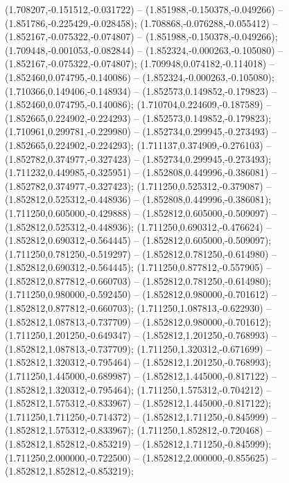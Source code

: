  (1.708207,-0.151512,-0.031722) -- (1.851988,-0.150378,-0.049266) -- (1.851786,-0.225429,-0.028458);
 (1.708868,-0.076288,-0.055412) -- (1.852167,-0.075322,-0.074807) -- (1.851988,-0.150378,-0.049266);
 (1.709448,-0.001053,-0.082844) -- (1.852324,-0.000263,-0.105080) -- (1.852167,-0.075322,-0.074807);
 (1.709948,0.074182,-0.114018) -- (1.852460,0.074795,-0.140086) -- (1.852324,-0.000263,-0.105080);
 (1.710366,0.149406,-0.148934) -- (1.852573,0.149852,-0.179823) -- (1.852460,0.074795,-0.140086);
 (1.710704,0.224609,-0.187589) -- (1.852665,0.224902,-0.224293) -- (1.852573,0.149852,-0.179823);
 (1.710961,0.299781,-0.229980) -- (1.852734,0.299945,-0.273493) -- (1.852665,0.224902,-0.224293);
 (1.711137,0.374909,-0.276103) -- (1.852782,0.374977,-0.327423) -- (1.852734,0.299945,-0.273493);
 (1.711232,0.449985,-0.325951) -- (1.852808,0.449996,-0.386081) -- (1.852782,0.374977,-0.327423);
 (1.711250,0.525312,-0.379087) -- (1.852812,0.525312,-0.448936) -- (1.852808,0.449996,-0.386081);
 (1.711250,0.605000,-0.429888) -- (1.852812,0.605000,-0.509097) -- (1.852812,0.525312,-0.448936);
 (1.711250,0.690312,-0.476624) -- (1.852812,0.690312,-0.564445) -- (1.852812,0.605000,-0.509097);
 (1.711250,0.781250,-0.519297) -- (1.852812,0.781250,-0.614980) -- (1.852812,0.690312,-0.564445);
 (1.711250,0.877812,-0.557905) -- (1.852812,0.877812,-0.660703) -- (1.852812,0.781250,-0.614980);
 (1.711250,0.980000,-0.592450) -- (1.852812,0.980000,-0.701612) -- (1.852812,0.877812,-0.660703);
 (1.711250,1.087813,-0.622930) -- (1.852812,1.087813,-0.737709) -- (1.852812,0.980000,-0.701612);
 (1.711250,1.201250,-0.649347) -- (1.852812,1.201250,-0.768993) -- (1.852812,1.087813,-0.737709);
 (1.711250,1.320312,-0.671699) -- (1.852812,1.320312,-0.795464) -- (1.852812,1.201250,-0.768993);
 (1.711250,1.445000,-0.689987) -- (1.852812,1.445000,-0.817122) -- (1.852812,1.320312,-0.795464);
 (1.711250,1.575312,-0.704212) -- (1.852812,1.575312,-0.833967) -- (1.852812,1.445000,-0.817122);
 (1.711250,1.711250,-0.714372) -- (1.852812,1.711250,-0.845999) -- (1.852812,1.575312,-0.833967);
 (1.711250,1.852812,-0.720468) -- (1.852812,1.852812,-0.853219) -- (1.852812,1.711250,-0.845999);
 (1.711250,2.000000,-0.722500) -- (1.852812,2.000000,-0.855625) -- (1.852812,1.852812,-0.853219);
